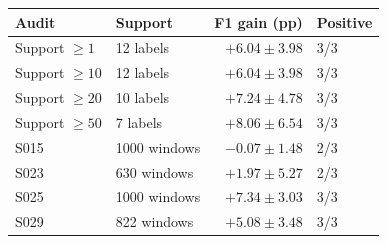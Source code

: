 \begin{tabular}{llrl}
\toprule
Audit & Support & F1 gain (pp) & Positive \\
\midrule
Support $\geq 1$ & 12 labels & $+6.04\pm3.98$ & 3/3 \\
Support $\geq 10$ & 12 labels & $+6.04\pm3.98$ & 3/3 \\
Support $\geq 20$ & 10 labels & $+7.24\pm4.78$ & 3/3 \\
Support $\geq 50$ & 7 labels & $+8.06\pm6.54$ & 3/3 \\
S015 & 1000 windows & $-0.07\pm1.48$ & 2/3 \\
S023 & 630 windows & $+1.97\pm5.27$ & 2/3 \\
S025 & 1000 windows & $+7.34\pm3.03$ & 3/3 \\
S029 & 822 windows & $+5.08\pm3.48$ & 3/3 \\
\bottomrule
\end{tabular}
